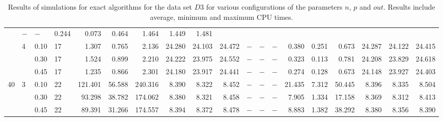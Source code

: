 \documentclass[thesis=B,english]{FITthesis}[2012/10/20]
\begin{document}
\begin{table}[h!]
\begin{adjustbox}{angle=90}
{\begin{tabular}{l|l|l|l|r|r|r|r|r|r|r|r|r|r|r|r|r|r|r|}
&     $-$ &     $-$ &       0.244 &  0.073 &   0.464 &       1.464 &   1.449 &   1.481 \\   & 4 & 0.10 & 17 &    1.307 &   0.765 &    2.136 &  24.280 &  24.103 &  24.472 &     $-$ &     $-$ &     $-$ &       0.380 &  0.251 &   0.673 &      24.287 &  24.122 &  24.415 \\   &   & 0.30 & 17 &    1.524 &   0.899 &    2.210 &  24.222 &  23.975 &  24.552 &     $-$ &     $-$ &     $-$ &       0.323 &  0.113 &   0.781 &      24.208 &  23.829 &  24.618 \\   &   & 0.45 & 17 &    1.235 &   0.866 &    2.301 &  24.180 &  23.917 &  24.441 &     $-$ &     $-$ &     $-$ &       0.274 &  0.128 &   0.673 &      24.148 &  23.927 &  24.403 \\40 & 3 & 0.10 & 22 &  121.401 &  56.588 &  240.316 &   8.390 &   8.322 &   8.452 &     $-$ &     $-$ &     $-$ &      21.435 &  7.312 &  50.445 &       8.396 &   8.335 &   8.504 \\   &   & 0.30 & 22 &   93.298 &  38.782 &  174.062 &   8.380 &   8.321 &   8.458 &     $-$ &     $-$ &     $-$ &       7.905 &  1.334 &  17.158 &       8.369 &   8.312 &   8.413 \\   &   & 0.45 & 22 &   89.391 &  31.266 &  174.557 &   8.394 &   8.372 &   8.478 &     $-$ &     $-$ &     $-$ &       8.883 &  1.382 &  38.292 &       8.380 &   8.356 &   8.390 \\
			 \hline 
			\end{tabular} 
			
			
			
			}
			
\end{adjustbox}
    
    \caption{Results of simulations for exact algorithms for the data set $D3$ for various configurations of the parameters $n$, $p$ and $out$. Results include average, minimum and maximum CPU times.}
    \label{table:exact:3}
\end{table}
\end{document}
